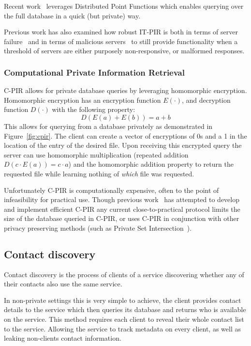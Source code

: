 Recent work~\cite{demmler2018pir} leverages Distributed Point Functions which
enables querying over the full database in a quick (but private) way.

Previous work has also examined how robust IT-PIR is both in terms of server
failure~\cite{beimel2002robust} and in terms of malicious
servers~\cite{devet2012optimally} to still provide functionality when a
threshold of servers are either purposely non-responsive, or malformed
responses.

\subsubsection{Computational Private Information Retrieval}
\computationalPIR

C-PIR allows for private database queries by leveraging homomorphic encryption. Homomorphic encryption has an encryption function $E(\cdot)$, and decryption function $D(\cdot)$ with the following property:
\[
    D(E(a) + E(b)) = a + b
\]
This allows for querying from a database privately as demonstrated in
Figure~\ref{fig:cpir}. The client can create a vector of encryptions of 0s and a
1 in the location of the entry of the desired file. Upon receiving this
encrypted query the server can use homomorphic multiplication (repeated addition
$D(c\cdot E(a)) = c\cdot a$) and the homomorphic addition property to return the
requested file while learning nothing of \textit{which} file was requested.

Unfortunately C-PIR is computationally expensive, often to the point of
infeasibility for practical use. Though previous
work~\cite{aguilar2016xpir,dong2014fast,gentry2005single} has attempted to
develop and implement efficient C-PIR any current close-to-practical protocol
limits the size of the database queried in C-PIR, or uses C-PIR in conjunction
with other privacy preserving methods (such as Private Set
Intersection~\cite{freedman2004efficient}).

\subsection{Contact discovery}\label{ssec:contactDiscovery}
Contact discovery is the process of clients of a service discovering whether any
of their contacts also use the same service.

In non-private settings this is very simple to achieve, the client provides
contact details to the service which then queries its database and returns who
is available on the service. This method requires each client to reveal their
whole contact list to the service. Allowing the service to track metadata on
every client, as well as leaking non-clients contact information.

